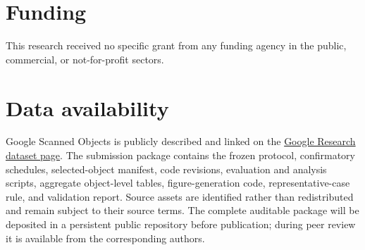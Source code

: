\documentclass[12pt,a4paper]{article}
\begin{document}
\section*{Funding}

This research received no specific grant from any funding agency in the public, commercial, or not-for-profit sectors.

\section*{Data availability}

Google Scanned Objects is publicly described and linked on the \href{https://research.google/pubs/google-scanned-objects-a-high-quality-dataset-of-3d-scanned-household-items/}{Google Research dataset page}. The submission package contains the frozen protocol, confirmatory schedules, selected-object manifest, code revisions, evaluation and analysis scripts, aggregate object-level tables, figure-generation code, representative-case rule, and validation report. Source assets are identified rather than redistributed and remain subject to their source terms. The complete auditable package will be deposited in a persistent public repository before publication; during peer review it is available from the corresponding authors.

\printbibliography
\end{document}
